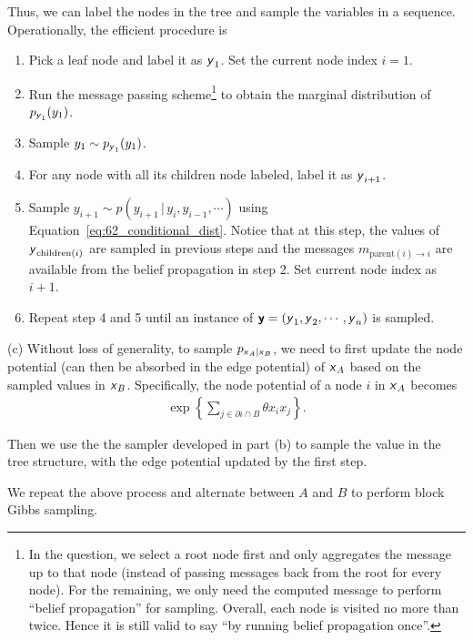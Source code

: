 \documentclass{article}
\newcommand{\s}[1]{\textsf{\textit{#1}}}
\newcommand{\bs}[1]{\textsf{\textbf{#1}}}
\begin{document}
Thus, we can label the nodes in the tree and sample the variables in a sequence.
%
Operationally, the efficient procedure is
\begin{enumerate}
	\item Pick a leaf node and label it as $\s{y}_1$. Set the current node index $i=1$.
	\item Run the message passing scheme\footnote{In the question, we select a root node
		  first and only aggregates the message up to that node
		  (instead of passing messages back from the root for every node).
		  For the remaining, we
		  only need the computed message to perform ``belief propagation'' for sampling.
		  Overall, each node is visited no more than twice. Hence it is still valid to say 		  ``by running belief propagation once''.}
		  to obtain the marginal distribution of $p_{\s{y}_1}(y_1)$.
	\item Sample $y_1 \sim p_{\s{y}_1}(y_1)$.
	\item For any node with all its children node labeled, label it as $\s{y}_{i+1}$.
	\item Sample $y_{i+1} \sim p(y_{i+1} \,\big|\, y_i, y_{i-1}, \cdots )$ using
		  Equation~\eqref{eq:62_conditional_dist}. Notice that at this step, the values of
		  $\s{y}_{\text{children}(i)}$ are sampled in previous steps and the messages
		  $m_{\text{parent}(i)\to i}$ are available from the belief propagation in step 2.
		  Set current node index as $i + 1$.
	\item Repeat step 4 and 5 until an instance of $\bs{y} = (\s{y}_1, \s{y}_2, \cdots, 		  \s{y}_n)$ is sampled.\\
\end{enumerate}
%

\noindent
(c) Without loss of generality, to sample $p_{\s{x}_A | \s{x}_B}$, we need to first
update the node potential (can then be absorbed in the edge potential) of
$\s{x}_A$ based on the sampled values in $\s{x}_B$. Specifically, the node potential
of a node $i$ in $\s{x}_A$ becomes
\begin{align*}
	\exp\left\{{\sum_{j \in \partial i \cap B} \theta}x_ix_j\right\}.
\end{align*}

Then we use the the sampler developed in part (b) to sample the value in the
tree structure, with the edge potential updated by the first step.

We repeat the above process and alternate between $A$ and $B$ to perform
block Gibbs sampling.
\pagebreak
\end{document}
